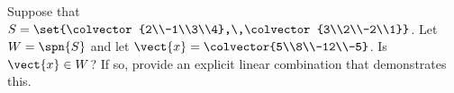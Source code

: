 Suppose that $S=\set{\colvector{2\\-1\\3\\4},\,\colvector{3\\2\\-2\\1}}$. Let $W=\spn{S}$ and let $\vect{x}=\colvector{5\\8\\-12\\-5}$.  Is $\vect{x}\in W$?  If so, provide an explicit linear combination that demonstrates this.